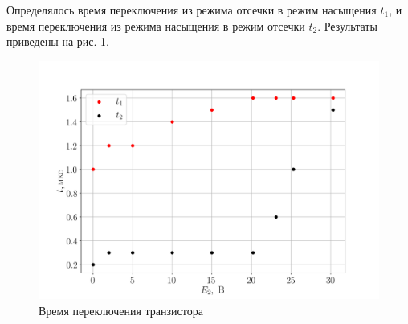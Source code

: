Определялось время переключения из режима отсечки в режим насыщения $t_1$, и время переключения из режима насыщения в
режим отсечки $t_2$. Результаты приведены на рис. \ref{fig:12}.
\begin{figure}[h!]
	\centering
	\includegraphics[width=0.8\linewidth]{fig/task6.png}
	\caption{Время переключения транзистора}
	\label{fig:12}
\end{figure}


